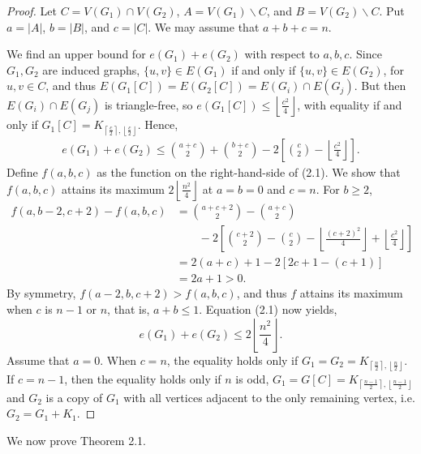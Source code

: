 \documentclass[12pt]{report}
\begin{document}
\begin{proof}
  Let $C = V(G_1) \cap V(G_2)$, $A = V(G_1) \backslash C$, and $B = V(G_2) \backslash C$. Put $a = |A|$, $b = |B|$, and $c = |C|$. We may assume that $a + b + c = n$.

  We find an upper bound for $e(G_1) + e(G_2)$ with respect to $a, b, c$. Since $G_1, G_2$ are induced graphs, $\{u, v\} \in E(G_1)$ if and only if $\{u, v\} \in E(G_2)$, for $u, v \in C$, and thus $E(G_1[C]) = E(G_2[C]) = E(G_i) \cap E(G_j)$. But then $E(G_i) \cap E(G_j)$ is triangle-free, so $e(G_1[C]) \leq \left\lfloor\frac{c^2}{4}\right\rfloor$, with equality if and only if $G_1[C] = K_{\left\lceil\frac{c}{2}\right\rceil, \left\lfloor\frac{c}{2}\right\rfloor}$. Hence, 
  \begin{gather}
    e(G_1) + e(G_2) \leq \binom{a + c}{2} + \binom{b + c}{2} - 2\left[\binom{c}{2} - \left\lfloor\frac{c^2}{4}\right\rfloor\right].
  \end{gather}
  Define $f(a, b, c)$ as the function on the right-hand-side of (2.1). We show that $f(a, b, c)$ attains its maximum $2\left\lfloor\frac{n^2}{4}\right\rfloor$ at $a = b = 0$ and $c = n$. For $b \geq 2$,
  \begin{align*}
    f(a, b - 2, c + 2) - f(a, b, c)
    &= \binom{a + c + 2}{2} - \binom{a + c}{2} \\
    &\qquad - 2\left[\binom{c + 2}{2} - \binom{c}{2} - \left\lfloor\frac{(c + 2)^2}{4}\right\rfloor + \left\lfloor\frac{c^2}{4}\right\rfloor\right] \\
    &= 2(a + c) + 1 - 2[2c + 1 - (c + 1)] \\
    &= 2a + 1 > 0.
  \end{align*}
  By symmetry, $f(a - 2, b, c + 2) > f(a, b, c)$, and thus $f$ attains its maximum when $c$ is $n - 1$ or $n$, that is, $a + b \leq 1$. Equation (2.1) now yields, 
  \[
    e(G_1) + e(G_2) \leq 2\left\lfloor\frac{n^2}{4}\right\rfloor.
  \]
  Assume that $a = 0$. When $c = n$, the equality holds only if $G_1 = G_2 = K_{\left\lceil\frac{n}{2}\right\rceil, \left\lfloor\frac{n}{2}\right\rfloor}$. If $c = n - 1$, then the equality holds only if $n$ is odd, $G_1 = G[C] = K_{\left\lceil\frac{n - 1}{2}\right\rceil, \left\lfloor\frac{n - 1}{2}\right\rfloor}$ and $G_2$ is a copy of $G_1$ with all vertices adjacent to the only remaining vertex, i.e. $G_2 = G_1 + K_1$.
\end{proof}

We now prove Theorem 2.1.
\end{document}
